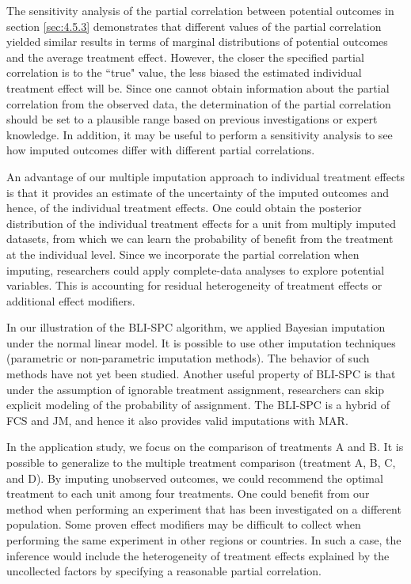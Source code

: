 	The sensitivity analysis of the partial correlation between potential outcomes in section \ref{sec:4.5.3}  demonstrates that different values of the partial correlation yielded similar results in terms of marginal distributions of potential outcomes and the average treatment effect. However, the closer the specified partial correlation is to the ``true" value, the less biased the estimated individual treatment effect will be. Since one cannot obtain information about the partial correlation from the observed data, the determination of the partial correlation should be set to a plausible range based on previous investigations or expert knowledge. In addition, it may be useful to perform a sensitivity analysis to see how imputed outcomes differ with different partial correlations. 
	
	An advantage of our multiple imputation approach to individual treatment effects is that it provides an estimate of the uncertainty of the imputed outcomes and hence, of the individual treatment effects. One could obtain the posterior distribution of the individual treatment effects for a unit from multiply imputed datasets, from which we can learn the probability of benefit from the treatment at the individual level. Since we incorporate the partial correlation when imputing, researchers could apply complete-data analyses to explore potential variables. This is accounting for residual heterogeneity of treatment effects or additional effect modifiers. 
	
	In our illustration of the BLI-SPC algorithm, we applied Bayesian imputation under the normal linear model. It is possible to use other imputation techniques (parametric or non-parametric imputation methods). The behavior of such methods have not yet been studied. Another useful property of BLI-SPC is that under the assumption of ignorable treatment assignment, researchers can skip explicit modeling of the probability of assignment. The BLI-SPC is a hybrid of FCS and JM, and hence it also provides valid imputations with MAR. 
	
	In the application study, we focus on the comparison of treatments A and B. It is possible to generalize to the multiple treatment comparison (treatment A, B, C, and D). By imputing unobserved outcomes, we could recommend the optimal treatment to each unit among four treatments. One could benefit from our method when performing an experiment that has been investigated on a different population. Some proven effect modifiers may be difficult to collect when performing the same experiment in other regions or countries. In such a case, the inference would include the heterogeneity of treatment effects explained by the uncollected factors by specifying a reasonable partial correlation.         
	
